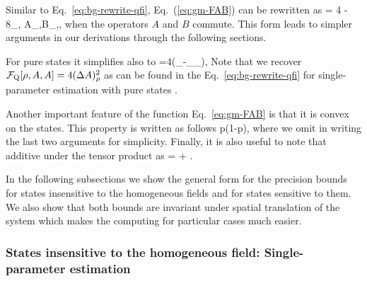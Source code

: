 Similar to Eq.~\eqref{eq:bg-rewrite-qfi}, Eq.~(\ref{eq:gm-FAB}) can be rewritten as
\be
  \label{eq:gm-FAB-rewrite-with-trace}
   = 4 
  - 8\sum_{\lambda,\nu} 
  {A}_{\lambda,\nu}{B}_{\nu,\lambda},
\ee
when the operators $A$ and $B$ commute.
This form leads to simpler arguments in our derivations through the following sections.

For pure states it simplifies also to
\be
  =4\left(_{\psi}-_{\psi}_{\psi}\right),
  \label{eq:gm-FAB-pure}
\ee
Note that we recover $\mathcal{F}_{\textnormal{Q}}[{\textstyle \rho,A,A}]=4(\Delta A)_\rho^2$ as can be found in the Eq.~\eqref{eq:bg-rewrite-qfi} for single-parameter estimation with pure states \cite{Paris2009,Toth2013}.

Another important feature of the function Eq.~\eqref{eq:gm-FAB} is that it is convex on the states.
This property is written as follows
\be
  \leqslant
  p(1{-}p),
  \label{eq:gm-FAB-convex}
\ee
where we omit in writing the last two arguments for simplicity.
Finally, it is also useful to note that additive under the tensor product as
\be
   = + .
  \label{eq:gm-FAB-additive-under-tensor}
\ee

In the following subsections we show the general form for the precision bounds for states insensitive to the homogeneous fields and for states sensitive to them. We also show that both bounds are invariant under spatial translation of the system which makes the computing for particular cases much easier.

\subsubsection{States insensitive to the homogeneous field:
Single-parameter estimation}

